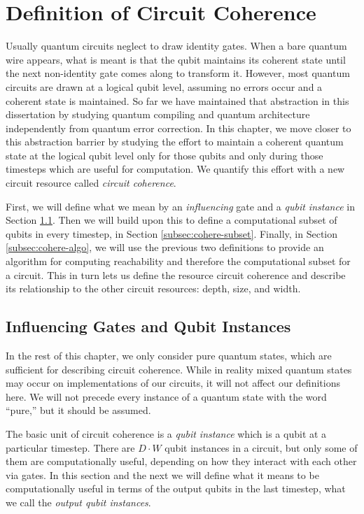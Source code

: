 \section{Definition of Circuit Coherence}
\label{sec:cohere-def}

Usually quantum circuits neglect to draw identity gates. When a bare
quantum wire appears, what is meant is that the qubit maintains its
coherent state until the next non-identity gate comes along to transform it.
However, most quantum circuits are drawn at a logical qubit level,
assuming no errors occur and a coherent state is maintained.
So far we have maintained that abstraction in this dissertation by studying
quantum compiling and quantum architecture independently from
quantum error correction. In this chapter, we move closer to
this abstraction barrier by studying
the effort to maintain a coherent quantum state at the logical qubit level
only for those qubits and only during those timesteps which are useful
for computation.
We quantify this effort with a new circuit resource called \emph{circuit coherence}.

First, we will define what we mean by an \emph{influencing} gate and
a \emph{qubit instance}
in Section \ref{subsec:cohere-entangle}. Then we will build upon this
to define a computational subset of qubits in every
timestep, in Section \ref{subsec:cohere-subset}. Finally,
in Section \ref{subsec:cohere-algo}, we will use
the previous two definitions to provide an algorithm for
computing reachability and therefore the computational subset for a circuit.
This in turn lets us define the resource circuit coherence and
describe its relationship to the other circuit resources: depth, size, and
width. 

\subsection{Influencing Gates and Qubit Instances}
\label{subsec:cohere-entangle}

In the rest of this chapter, we only consider pure quantum states, which are
sufficient for describing circuit coherence. While in reality
mixed quantum states may occur on implementations of our circuits, it
will not affect our definitions here. We will not precede every
instance of a quantum state with the word ``pure,'' but it should be
assumed.

The basic unit of circuit coherence is a \emph{qubit instance} which is
a qubit at a particular timestep. There are $D\cdot W$ qubit instances
in a circuit, but only some of them are computationally useful, depending
on how they interact with each other via gates. In this section and
the next we will define what it means to be computationally useful in terms
of the output qubits in the last timestep, what we call the
\emph{output qubit instances}.

